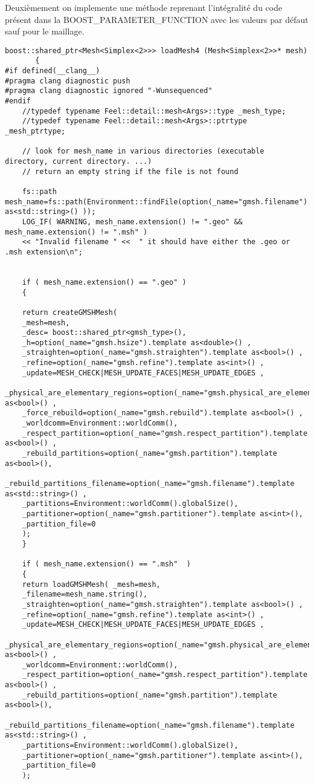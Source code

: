 \documentclass[12pt]{article}
\begin{document}
\vspace{0.5 cm}
Deuxièmement on implemente une méthode reprenant l'intégralité du code présent dans la BOOST\_PARAMETER\_FUNCTION avec les valeurs par défaut sauf pour le maillage.
\begin{lstlisting}
boost::shared_ptr<Mesh<Simplex<2>>> loadMesh4 (Mesh<Simplex<2>>* mesh)
       {
#if defined(__clang__)
#pragma clang diagnostic push
#pragma clang diagnostic ignored "-Wunsequenced"
#endif
    //typedef typename Feel::detail::mesh<Args>::type _mesh_type;
    //typedef typename Feel::detail::mesh<Args>::ptrtype _mesh_ptrtype;

    // look for mesh_name in various directories (executable directory, current directory. ...)
    // return an empty string if the file is not found

    fs::path mesh_name=fs::path(Environment::findFile(option(_name="gmsh.filename").template as<std::string>() ));
    LOG_IF( WARNING, mesh_name.extension() != ".geo" && mesh_name.extension() != ".msh" )
    << "Invalid filename " <<  " it should have either the .geo or .msh extension\n";


    if ( mesh_name.extension() == ".geo" )
    {

    return createGMSHMesh(
    _mesh=mesh,
    _desc= boost::shared_ptr<gmsh_type>(),
    _h=option(_name="gmsh.hsize").template as<double>() ,
    _straighten=option(_name="gmsh.straighten").template as<bool>() ,
    _refine=option(_name="gmsh.refine").template as<int>() ,
    _update=MESH_CHECK|MESH_UPDATE_FACES|MESH_UPDATE_EDGES ,
    _physical_are_elementary_regions=option(_name="gmsh.physical_are_elementary_regions").template as<bool>() ,
    _force_rebuild=option(_name="gmsh.rebuild").template as<bool>() ,
    _worldcomm=Environment::worldComm(),
    _respect_partition=option(_name="gmsh.respect_partition").template as<bool>() ,
    _rebuild_partitions=option(_name="gmsh.partition").template as<bool>(),
    _rebuild_partitions_filename=option(_name="gmsh.filename").template as<std::string>() ,
    _partitions=Environment::worldComm().globalSize(),
    _partitioner=option(_name="gmsh.partitioner").template as<int>(),
    _partition_file=0           
    );
    }

    if ( mesh_name.extension() == ".msh"  )
    {
    return loadGMSHMesh( _mesh=mesh,
    _filename=mesh_name.string(),
    _straighten=option(_name="gmsh.straighten").template as<bool>() ,
    _refine=option(_name="gmsh.refine").template as<int>() ,
    _update=MESH_CHECK|MESH_UPDATE_FACES|MESH_UPDATE_EDGES ,
    _physical_are_elementary_regions=option(_name="gmsh.physical_are_elementary_regions").template as<bool>() ,
    _worldcomm=Environment::worldComm(),
    _respect_partition=option(_name="gmsh.respect_partition").template as<bool>() ,
    _rebuild_partitions=option(_name="gmsh.partition").template as<bool>(),
    _rebuild_partitions_filename=option(_name="gmsh.filename").template as<std::string>() ,
    _partitions=Environment::worldComm().globalSize(),
    _partitioner=option(_name="gmsh.partitioner").template as<int>(),
    _partition_file=0   
    );


\end{lstlisting}
\end{document}
